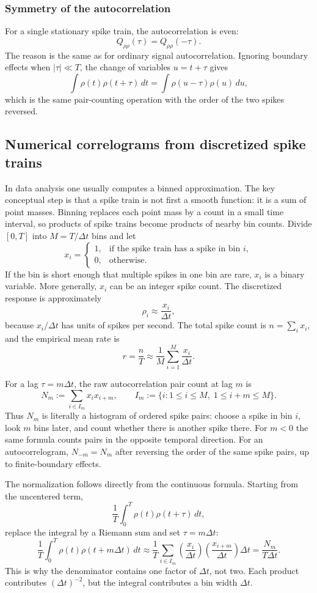\documentclass[11pt]{article}
\begin{document}
\subsubsection{Symmetry of the autocorrelation}

For a single stationary spike train, the autocorrelation is even:
\[
Q_{\rho\rho}(\tau)=Q_{\rho\rho}(-\tau).
\]
The reason is the same as for ordinary signal autocorrelation. Ignoring boundary effects when $|\tau|\ll T$, the change of variables $u=t+\tau$ gives
\[
\int \rho(t)\rho(t+\tau)\,dt
=
\int \rho(u-\tau)\rho(u)\,du,
\]
which is the same pair-counting operation with the order of the two spikes reversed.

\subsection{Numerical correlograms from discretized spike trains}

In data analysis one usually computes a binned approximation. The key
conceptual step is that a spike train is not first a smooth function: it is a
sum of point masses. Binning replaces each point mass by a count in a small
time interval, so products of spike trains become products of nearby bin
counts. Divide $[0,T]$ into $M=T/\Delta t$ bins and let
\[
x_i=
\begin{cases}
1, & \text{if the spike train has a spike in bin }i,\\
0, & \text{otherwise.}
\end{cases}
\]
If the bin is short enough that multiple spikes in one bin are rare, $x_i$ is a
binary variable. More generally, $x_i$ can be an integer spike count. The
discretized response is approximately
\[
\rho_i \approx \frac{x_i}{\Delta t},
\]
because $x_i/\Delta t$ has units of spikes per second. The total spike count is
$n=\sum_i x_i$, and the empirical mean rate is
\[
\hat r=\frac{n}{T}
\approx
\frac{1}{M}\sum_{i=1}^M \frac{x_i}{\Delta t}.
\]

For a lag $\tau=m\Delta t$, the raw autocorrelation pair count at lag $m$ is
\[
N_m:=
\sum_{i\in I_m} x_i x_{i+m},
\qquad
I_m:=\{i:1\le i\le M,\;1\le i+m\le M\}.
\]
Thus $N_m$ is literally a histogram of ordered spike pairs: choose a spike in
bin $i$, look $m$ bins later, and count whether there is another spike there.
For $m<0$ the same formula counts pairs in the opposite temporal direction.
For an autocorrelogram, $N_{-m}=N_m$ after reversing the order of the same spike
pairs, up to finite-boundary effects.

The normalization follows directly from the continuous formula. Starting from
the uncentered term,
\[
\frac{1}{T}\int_0^T \rho(t)\rho(t+\tau)\,dt,
\]
replace the integral by a Riemann sum and set $\tau=m\Delta t$:
\[
\frac{1}{T}\int_0^T \rho(t)\rho(t+m\Delta t)\,dt
\approx
\frac{1}{T}\sum_{i\in I_m}
\left(\frac{x_i}{\Delta t}\right)
\left(\frac{x_{i+m}}{\Delta t}\right)\Delta t
=
\frac{N_m}{T\Delta t}.
\]
This is why the denominator contains one factor of $\Delta t$, not two. Each
product contributes $(\Delta t)^{-2}$, but the integral contributes a bin width
$\Delta t$.
\end{document}
